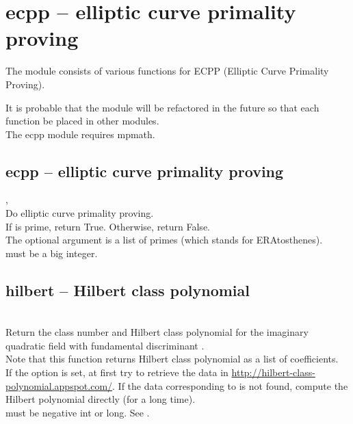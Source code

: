 

 \section{ecpp -- elliptic curve primality proving}
 The module consists of various functions for ECPP (Elliptic Curve Primality Proving).

 It is probable that the module will be refactored in the future so that each function be placed in other modules.\\
\spacing
The ecpp module requires mpmath.

%
  \subsection{ecpp -- elliptic curve primality proving}
   {%
     ,\ %
   }{%
   }\\
   \spacing
   \quad Do elliptic curve primality proving.\\
   If  is prime, return True. Otherwise, return False. \\
   \spacing
   The optional argument  is a list of primes (which stands for ERAtosthenes).\\
   \spacing
   \quad {} must be a big integer.\\
%
  \subsection{hilbert -- Hilbert class polynomial}
        {}
        {}\\
   \spacing
   \quad Return the class number and Hilbert class polynomial for the imaginary quadratic field with fundamental discriminant .\\
   \spacing
   \quad Note that this function returns Hilbert class polynomial as a list of coefficients.\\
   \negok If the option  is set, at first try to retrieve the data in \url{http://hilbert-class-polynomial.appspot.com/}.
   If the data corresponding to  is not found, compute the Hilbert polynomial directly (for a long time).\\
   \spacing
   \quad {} must be negative int or long. See \cite{Pomerance}.\\
%
